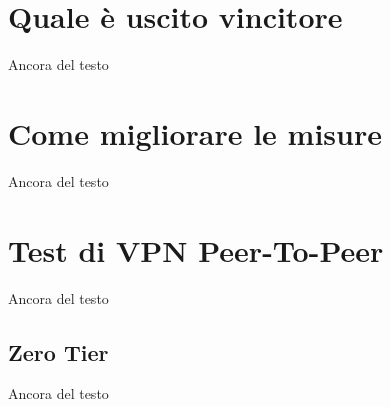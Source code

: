 \section{Quale è uscito vincitore}
Ancora del testo

\section{Come migliorare le misure}
Ancora del testo

\section{Test di VPN Peer-To-Peer}
Ancora del testo
\subsection{Zero Tier}
Ancora del testo